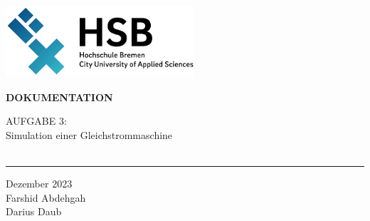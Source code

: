 \begin{titlepage}
    \color{haw}
    \raggedright
    \hfill\includegraphics[width=7cm]{HSB.png}\\
  
    \vspace{5cm}
  
    \setmainfont{Open Sans}
    \small
    \textbf{DOKUMENTATION}
  
    \vspace{8mm}
  
    \begin{minipage}{0.8\linewidth}
      \LARGE
      AUFGABE 3:\\[1mm]
      Simulation einer Gleichstrommaschine\\[1mm]
      \,\rule{11mm}{1.2mm}
    \end{minipage}
  
    \vspace{1cm}
  
    Dezember 2023\\
    Farshid Abdehgah \\
    Darius Daub
  
    \vspace{5cm}
  

\end{titlepage}
